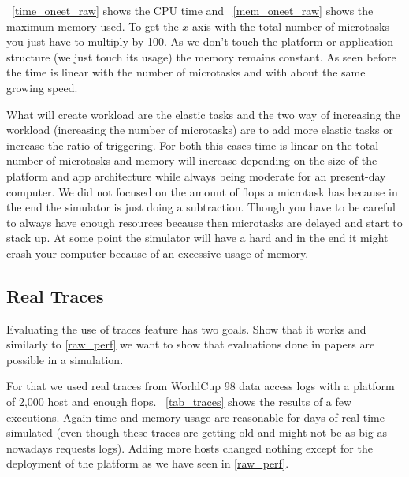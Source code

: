 \documentclass[a4paper, onecolumn, 11pt]{article}
\begin{document}
    \figurename~\ref{time_oneet_raw} shows the CPU time and
    \figurename~\ref{mem_oneet_raw} shows the maximum memory used. To get the
    $x$ axis with the total number of microtasks you just have to multiply by
    100. As we don't touch the platform or application structure (we just touch
    its usage) the memory remains constant. As seen before the time is linear
    with the number of microtasks and with about the same growing speed.
    
    What will create workload are the elastic tasks and the two way of
    increasing the workload (increasing the number of microtasks) are to add
    more elastic tasks or increase the ratio of triggering. For both this cases
    time is linear on the total number of microtasks and memory will increase
    depending on the size of the platform and app architecture while always
    being moderate for an present-day computer. We did not focused on the amount
    of flops a microtask has because in the end the simulator is just doing a
    subtraction. Though you have to be careful to always have enough resources
    because then microtasks are delayed and start to stack up. At some point the
    simulator will have a hard and in the end it might crash your computer
    because of an excessive usage of memory.
    
    
       
  \subsection{Real Traces} \label{real_traces}
		Evaluating the use of traces feature has two goals. Show that it works and
    similarly to \ref{raw_perf} we want to show that evaluations done in papers
    are possible in a simulation.
    
    For that we used real traces from WorldCup 98 data access logs \cite{wc98}
    with a platform of 2,000 host and enough flops. \figurename~\ref{tab_traces}
    shows the results of a few executions. Again time and memory usage are
    reasonable for days of real time simulated (even though these traces are
    getting old and might not be as big as nowadays requests logs). Adding more
    hosts changed nothing except for the deployment of the platform as we have
    seen in \ref{raw_perf}.
\end{document}
